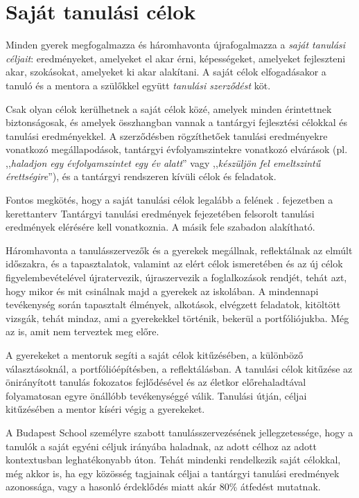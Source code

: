 \section{Saját tanulási célok}
\label{sec:tanulasi_celok}

Minden gyerek megfogalmazza és háromhavonta újrafogalmazza a \emph{saját
      tanulási céljait}: eredményeket, amelyeket el akar érni, képességeket,
amelyeket fejleszteni akar, szokásokat, amelyeket ki akar alakítani. A saját
célok elfogadásakor a tanuló és a mentora a szülőkkel együtt \emph{tanulási
      szerződést} köt.

Csak olyan célok kerülhetnek a saját célok közé, amelyek
minden érintettnek biztonságosak, és amelyek összhangban vannak a tantárgyi
fejlesztési célokkal és tanulási eredményekkel. A szerződésben rögzíthetőek
tanulási eredményekre
vonatkozó megállapodások,
tantárgyi évfolyamszintekre vonatkozó elvárások (pl. ,,\emph{haladjon egy
      évfolyamszintet egy év alatt}'' vagy ,,\emph{készüljön fel emeltszintű
      érettségire}''), és a tantárgyi rendszeren kívüli célok és
feladatok.

Fontos megkötés, hogy a saját tanulási célok legalább a felének
\ifkerettanterv
      . fejezetben
\else
      a kerettanterv Tantárgyi tanulási eredmények fejezetében
\fi
felsorolt tanulási eredmények elérésére kell vonatkoznia. A másik
fele szabadon alakítható.

Háromhavonta a tanulásszervezők és a gyerekek megállnak, reflektálnak az elmúlt
időszakra, és a tapasztalatok, valamint az elért célok ismeretében és az új
célok figyelembevételével újratervezik, újraszervezik a foglalkozások rendjét,
tehát azt, hogy mikor és mit csinálnak majd a gyerekek az iskolában.
A mindennapi tevékenység során tapasztalt élmények, alkotások, elvégzett
feladatok, kitöltött vizsgák, tehát mindaz, ami a gyerekekkel történik, bekerül
a portfóliójukba. Még az is, amit nem terveztek meg előre.

A gyerekeket a mentoruk segíti a saját célok kitűzésében, a különböző
választásoknál, a portfólióépítésben, a reflektálásban. A tanulási célok
kitűzése az önirányított tanulás fokozatos fejlődésével és az életkor
előrehaladtával folyamatosan egyre önállóbb tevékenységgé válik. Tanulási
útján, céljai kitűzésében a mentor kíséri végig a gyerekeket.

A Budapest School személyre szabott tanulásszervezésének jellegzetessége, hogy
a tanulók a saját egyéni céljuk irányába haladnak, az adott célhoz az adott
kontextusban leghatékonyabb úton. Tehát mindenki rendelkezik saját célokkal,
még akkor is, ha egy közösség tagjainak céljai a tantárgyi tanulási eredmények
azonossága, vagy a hasonló érdeklődés miatt akár  80\% átfedést mutatnak.

